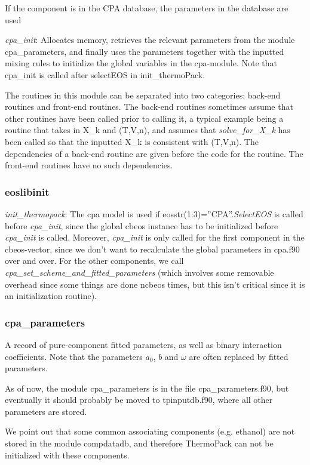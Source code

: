 \documentclass[10pt, a4paper]{article}
\begin{document}
 If the component is in the CPA database, the parameters in the database are used

\textit{cpa\_init}: Allocates memory, retrieves the relevant parameters from the module cpa\_parameters, and finally uses the parameters together with the inputted mixing rules to initialize the global variables in the cpa-module. Note that cpa\_init is called after selectEOS in init\_thermoPack.

The routines in this module can be separated into two categories: back-end routines and front-end routines. The back-end routines sometimes assume that other routines have been called prior to calling it, a typical example being a routine that takes in X\_k and (T,V,n), and assumes that \textit{solve\_for\_X\_k} has been called so that the inputted X\_k is consistent with (T,V,n). The dependencies of a back-end routine are given before the code for the routine. The front-end routines have no such dependencies.

\subsubsection*{eoslibinit}
\textit{init\_thermopack}: The cpa model is used if eosstr(1:3)=''CPA''.\textit{SelectEOS} is called before \textit{cpa\_init}, since the global cbeos instance has to be initialized before \textit{cpa\_init} is called. Moreover, \textit{cpa\_init} is only called for the first component in the cbeos-vector, since we don't want to recalculate the global parameters in cpa.f90 over and over. For the other components, we call \textit{cpa\_set\_scheme\_and\_fitted\_parameters} (which involves some removable overhead since some things are done ncbeos times, but this isn't critical since it is an initialization routine).

\subsubsection*{cpa\_parameters}
A record of pure-component fitted parameters, as well as binary interaction coefficients. Note that the parameters $a_0$, $b$ and $\omega$ are often replaced by fitted parameters.

As of now, the module cpa\_parameters is in the file cpa\_parameters.f90, but eventually it should probably be moved to tpinputdb.f90, where all other parameters are stored.

We point out that some common associating components (e.g. ethanol) are not stored in the module compdatadb, and therefore ThermoPack can not be initialized with these components.
\end{document}
